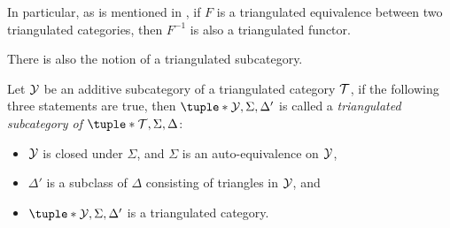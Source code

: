 In particular, as is mentioned in \cite[p.\ 4]{Happel_1988}, if \( F \) is a triangulated equivalence between two triangulated categories, then \( F^{-1} \) is also a triangulated functor.

There is also the notion of a triangulated subcategory.
\begin{definition}
    Let \( {\mathcal{Y}} \) be an additive subcategory of a triangulated category \( {\mathcal{T}} \), if the following three statements are true, then \( \tuple*{\Yc, \Sigma, \Delta'} \) is called a \emph{triangulated subcategory of \( \tuple*{\Tc, \Sigma, \Delta} \)}:
    \begin{itemize}
        \item {
            \( {\mathcal{Y}} \) is closed under \( \Sigma \), and \( \Sigma \) is an auto-equivalence on \( {\mathcal{Y}} \),
        }
        \item {
            \( \Delta' \) is a subclass of \( \Delta \) consisting of triangles in \( {\mathcal{Y}} \), and
        }
        \item {
            \( \tuple*{\Yc, \Sigma, \Delta'} \) is a triangulated category.
        }
    \end{itemize}
\end{definition}